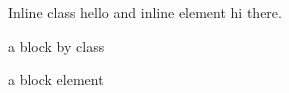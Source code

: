 Inline class hello and inline element hi there.

\begin{myblock}
a block by class
\end{myblock}

\begin{my-block}
a block element
\end{my-block}

